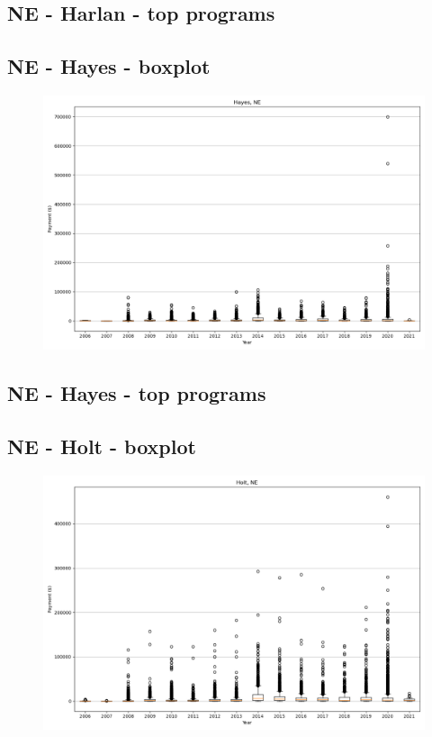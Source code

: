 \subsection*{NE - Harlan - top programs}

\newpage
\subsection*{NE - Hayes - boxplot}
\begin{figure}[h]
\centering
\includegraphics[width=7in]{../output/boxplots/counties/Hayes-NE_boxplot.png}
\end{figure}


\subsection*{NE - Hayes - top programs}

\newpage
\subsection*{NE - Holt - boxplot}
\begin{figure}[h]
\centering
\includegraphics[width=7in]{../output/boxplots/counties/Holt-NE_boxplot.png}
\end{figure}


